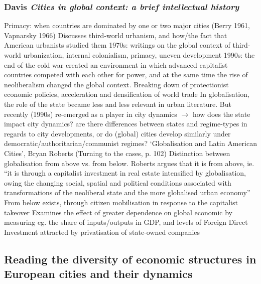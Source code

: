 \documentclass{article}
\begin{document}
\subsubsection{Davis \textit{Cities in global context: a brief intellectual history}}

\begin{outline}
	\1 Primacy: when countries are dominated by one or two major cities (Berry 1961, Vapnarsky 1966)
	\1 Discusses third-world urbanism, and how/the fact that American urbanists studied them 
	\1 1970s: writings on the global context of third-world urbanization, internal colonialism, primacy, uneven development
	\1 1990s: the end of the cold war created an environment in which advanced capitalist countries competed with each other for power, and at the same time the rise of neoliberalism changed the global context. Breaking down of protectionist economic policies, acceleration and densification of world trade
	\1 In globalisation, the role of the state became less and less relevant in urban literature. But recently (1990s) re-emerged as a player in city dynamics $\rightarrow$ how does the state impact city dynamics? are there differences between states and regime-types in regards to city developments, or do (global) cities develop similarly under democratic/authoritarian/communist regimes?
	\1 `Globalisation  and Latin American Cities', Bryan Roberts (Turning to the cases, p. 102)
		\2 Distinction between globalisation from above vs. from below. Roberts argues that it is from above, ie. ``it is through a capitalist investment in real estate intensified by globalisation, owing the changing social, spatial and political conditions associated with transformations of the neoliberal state and the more globalised urban economy''
		\2 From below exists, through citizen mobilisation in response to the capitalist takeover 
		\2 Examines the effect of greater dependence on global economic by measuring eg. the share of inputs/outputs in GDP, and levels of Foreign Direct Investment attracted by privatisation of state-owned companies
\end{outline}

\subsection{Reading the diversity of economic structures in European cities and their dynamics}
\end{document}
